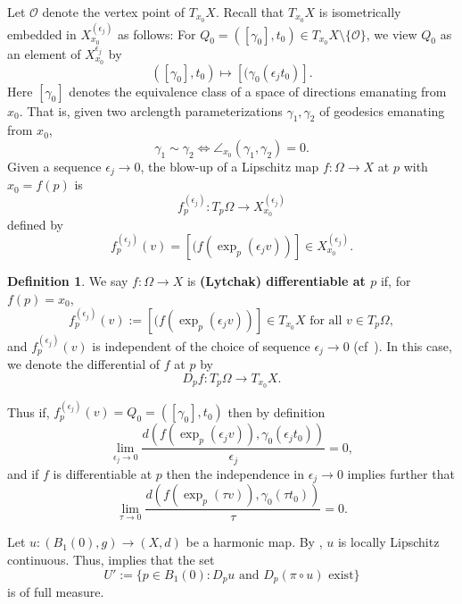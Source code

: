\documentclass[12pt]{amsart}
\theoremstyle{definition}
\newtheorem{definition}[theorem]{Definition}
\numberwithin{equation}{section}
\newcommand{\B}{B}
\begin{document}
Let $\mathcal O$ denote the vertex point of $T_{x_0}X$. Recall that $T_{x_0}X$ is isometrically embedded in $X_{x_0}^{(\epsilon_j)}$ as follows:  For $Q_0 =([\gamma_0],t_0) \in T_{x_0}X \setminus \{\mathcal O\}$, we view $Q_0$ as an element of $X_{x_0}^{\epsilon_j}$ by
 \[
([\gamma_0],t_0) \mapsto [(\gamma_0(\epsilon_j t_0)].
 \] Here $[\gamma_0]$ denotes the equivalence class of a space of directions emanating from $x_0$. That is, given two arclength parameterizations $\gamma_1, \gamma_2$ of geodesics emanating from $x_0$, 
$$\gamma_1 \sim \gamma_2 \Leftrightarrow \angle_{x_0}(\gamma_1,\gamma_2)=0.$$  
Given a sequence $\epsilon_j \to 0$, the  blow-up of a Lipschitz map $f:\Omega \to X$ at $p$  with $x_0=f(p)$ is
 $$f_p^{(\epsilon_j)}:T_p\Omega \to X_{x_0}^{(\epsilon_j)}$$  
defined by
$$
f_p^{(\epsilon_j)}(v) = [(f(\exp_p(\epsilon_j v))] \in X_{x_0}^{(\epsilon_j)}.
$$  
\begin{definition}We say $f:\Omega \to X$ is {\bf (Lytchak) differentiable at $p$} if, for $f(p)=x_0$, 
\[
f_p^{(\epsilon_j)}(v) :=[(f(\exp_p(\epsilon_j v))] \in T_{x_0}X  \text{ for all } v \in T_p \Omega,
 \]
and $f_p^{(\epsilon_j)}(v)$  is independent of the choice of sequence  $\epsilon_j \to 0$ (cf~\cite[Definition 7.1]{lytchak}).  In this case, we denote the differential of $f$ at $p$ by 
 $$D_pf:T_p\Omega \to T_{x_0}X.$$
 \end{definition}
 Thus if,
$ f_p^{(\epsilon_j)}(v)=Q_0=([\gamma_0],t_0)$ then by definition 
\begin{equation} \label{epj}
\lim_{\epsilon_j \to 0} \frac{d(f(\exp_p(\epsilon_j v)), \gamma_0(\epsilon_j t_0))}{\epsilon_j} =0,
 \end{equation} 
and if $f$ is differentiable at $p$ then the independence in $\epsilon_j \to 0$ implies further that
\begin{equation} \label{tau}
\lim_{\tau \to 0} \frac{d(f(\exp_p(\tau v)), \gamma_0(\tau t_0))}{\tau} = 0.
\end{equation}

Let $u: (\B_1(0),g) \rightarrow (X,d)$ be a harmonic map.  By \cite[Theorem 2.4.6]{korevaar-schoen1}, $u$ is locally Lipschitz continuous.  Thus, \cite[Theorem 1.6]{lytchak} implies that the set
\[
U' :=\{p \in \B_1(0): D_pu \mbox{ and } D_p (\pi \circ u) \mbox{ exist}\}
\]  
is of full measure.
\end{document}
